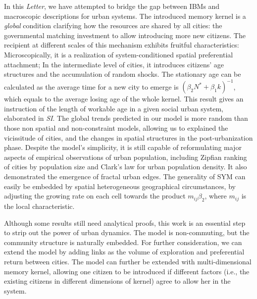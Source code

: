 \documentclass[reprint,unsortedaddress,amsmath,amssymb,aps,prl,showkeys]{revtex4-2}
\begin{document}
In this \textit{Letter}, we have attempted to bridge the gap between IBMs and macroscopic descriptions for urban systems. The introduced memory kernel is a \emph{global} condition clarifying how the resources are shared by all cities: the governmental matching investment to allow introducing more new citizens. The recipient at different scales of this mechanism exhibits fruitful characteristics: Microscopically, it is a realization of system-conditioned spatial preferential attachment; In the intermediate level of cities, it introduces citizens' age structures and the accumulation of random shocks. The stationary age can be calculated as the average time for a new city to emerge is $(\beta_2 N^* + \beta_1 k)^{-1}$, which equals to the average losing age of the whole kernel. This result gives an instruction of the length of workable age in a given social urban system, elaborated in \textit{SI}. The global trends predicted in our model is more random than those non spatial and non-constraint models, allowing us to explained the vicissitude of cities, and the changes in spatial structures in the post-urbanization phase. Despite the model's simplicity, it is still capable of reformulating major aspects of empirical observations of urban population, including Zipfian ranking of cities by population size and Clark's law for urban population density. It also demonstrated the emergence of fractal urban edges. The generality of SYM can easily be embedded by spatial heterogeneous geographical circumstances, by adjusting the growing rate on each cell towards the product $m_{ij}\beta_2$, where $m_{ij}$ is the local characteristic.

Although some results still need analytical proofs, this work is an essential step to strip out the power of urban dynamics. The model is non-commuting, but the community structure is naturally embedded. For further consideration, we can extend the model by adding links as the volume of exploration and preferential return between cities\cite{WANG2019121921}. The model can further be extended with multi-dimensional memory kernel, allowing one citizen to be introduced if different factors\cite{tokita2020social} (i.e., the existing citizens in different dimensions of kernel) agree to allow her in the system.




% 
\end{document}
